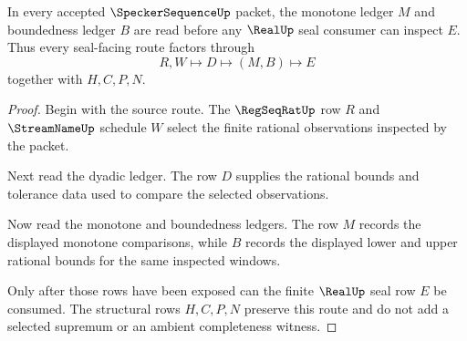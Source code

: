 \begin{theorem}
\label{thm:speckersequence-monotone-bounded-ledger}
In every accepted $\SpeckerSequenceUp$ packet, the monotone ledger $M$ and boundedness ledger $B$ are read before any $\RealUp$ seal consumer can inspect $E$. Thus every seal-facing route factors through
$$
R,W\longmapsto D\longmapsto (M,B)\longmapsto E
$$
together with $H,C,P,N$.
\end{theorem}
\begin{proof}
Begin with the source route. The $\RegSeqRatUp$ row $R$ and $\StreamNameUp$ schedule $W$ select the finite rational observations inspected by the packet.

Next read the dyadic ledger. The row $D$ supplies the rational bounds and tolerance data used to compare the selected observations.

Now read the monotone and boundedness ledgers. The row $M$ records the displayed monotone comparisons, while $B$ records the displayed lower and upper rational bounds for the same inspected windows.

Only after those rows have been exposed can the finite $\RealUp$ seal row $E$ be consumed. The structural rows $H,C,P,N$ preserve this route and do not add a selected supremum or an ambient completeness witness.
\end{proof}


